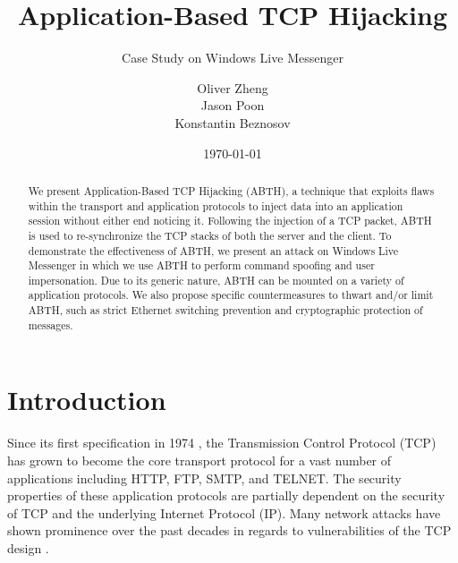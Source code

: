 \documentclass{sig-alternate}
\begin{document}

\title{
Application-Based TCP Hijacking
}
\subtitle{Case Study on Windows Live Messenger}

\author {
	\alignauthor
	Oliver Zheng\\
	\alignauthor
	Jason Poon\\
	\alignauthor
	Konstantin Beznosov\\
}

\date{\today}

\maketitle

\begin{abstract}
We present Application-Based TCP Hijacking (ABTH), a technique that exploits flaws within the transport and application protocols to inject data into an application session without either end noticing it. Following the injection of a TCP packet, ABTH is used to re-synchronize the TCP stacks of both the server and the client. To demonstrate the effectiveness of ABTH, we present an attack on Windows Live Messenger in which we use ABTH to perform command spoofing and user impersonation. Due to its generic nature, ABTH can be mounted on a variety of application protocols. We also propose specific countermeasures to thwart and/or limit ABTH, such as strict Ethernet switching prevention and cryptographic protection of messages.
\end{abstract}



\section{Introduction}

Since its first specification in 1974 \cite{rfc:tcp}, the Transmission Control Protocol (TCP) has grown to become the core transport protocol for a vast number of applications including HTTP, FTP, SMTP, and TELNET.
The security properties of these application protocols are partially dependent on the security of TCP and the underlying Internet Protocol (IP). Many network attacks have shown prominence over the past decades in regards to vulnerabilities of the TCP design \cite{harris:tcpattacks}.
\end{document}

